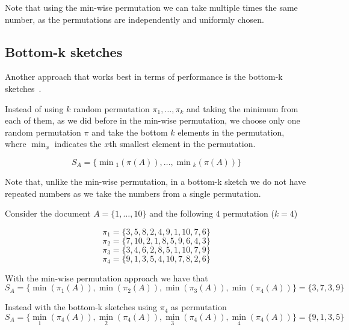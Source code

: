 \medskip

Note that using the min-wise permutation we can take multiple times the same number, as the permutations are independently and uniformly chosen.

\subsection*{Bottom-k sketches}

Another approach that works best in terms of performance is the bottom-k sketches~\cite{Cohen:2007:SDU:1281100.1281133}.\medskip

Instead of using $k$ random permutation $\pi_{1}, \ldots, \pi_{k}$ and taking the minimum from each of them,
as we did before in the min-wise permutation, we choose only one random permutation $\pi$ and take the bottom $k$ elements in the permutation, where $\min_{x}$ indicates the $x$th smallest element in the permutation.

\begin{equation}
S_{A} = \{ \min{\!}_{1}(\pi(A)), \ldots, \min{\!}_{k}(\pi(A)) \}
\end{equation}

\medskip

Note that, unlike the min-wise permutation, in a bottom-k sketch we do not have repeated numbers as we take the numbers from a single permutation.

\begin{esempio}
	Consider the document $A=\{1, \ldots, 10\}$ and the following $4$ permutation ($k = 4$)
	
	\begin{equation*}
	\pi_{1} = \{3, 5, 8, 2, 4, 9, 1, 10, 7, 6\}
	\end{equation*}
	\begin{equation*}
	\pi_{2} = \{7, 10, 2, 1, 8, 5, 9, 6, 4, 3\}
	\end{equation*}
	\begin{equation*}
	\pi_{3} = \{3, 4, 6, 2, 8, 5, 1, 10, 7, 9\}
	\end{equation*}
	\begin{equation*}
	\pi_{4} = \{9, 1, 3, 5, 4, 10, 7, 8, 2, 6\}
	\end{equation*}
	
	With the min-wise permutation approach we have that
	\begin{equation*}
	S_{A} = \{ \min(\pi_{1}(A)), \min(\pi_{2}(A)), \min(\pi_{3}(A)), \min(\pi_{4}(A)) \} = \{3, 7, 3, 9\}
	\end{equation*}
	
	Instead with the bottom-k sketches using $\pi_{4}$ as permutation
	\begin{equation*}
	S_{A} = \{ \min_{1}(\pi_{4}(A)), \min_{2}(\pi_{4}(A)), \min_{3}(\pi_{4}(A)), \min_{4}(\pi_{4}(A)) \} = \{9, 1, 3, 5\}
	\end{equation*}
	
\end{esempio}


